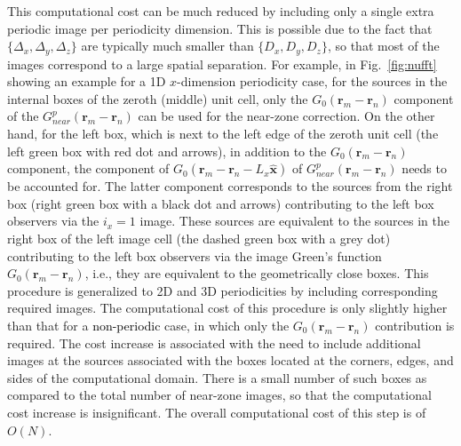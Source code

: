 \documentclass{article}
\begin{document}
This computational cost can be much reduced by including only a single extra periodic image per periodicity dimension. This is possible due to the fact that $\{\Delta_x,\Delta_y,\Delta_z\}$ are typically much smaller than $\{D_x,D_y,D_z\}$, so that most of the images correspond to a large spatial separation. For example, in Fig.~\ref{fig:nufft} showing an example for a 1D $x$-dimension periodicity case, for the sources in the internal boxes of the zeroth (middle) unit cell, only the $G_0(\mathbf{r}_m-\mathbf{r}_n)$ component of the $G^p_{near}(\mathbf{r}_m-\mathbf{r}_n)$ can be used for the near-zone correction. On the other hand, for the left box, which is next to the left edge of the zeroth unit cell (the left green box with red dot and arrows), in addition to the $G_0(\mathbf{r}_m-\mathbf{r}_n)$ component, the component of $G_0(\mathbf{r}_m-\mathbf{r}_n-L_x\mathbf{\hat{x}})$ of $G^p_{near}(\mathbf{r}_m-\mathbf{r}_n)$ needs to be accounted for. The latter component corresponds to the sources from the right box (right green box with a black dot and arrows) contributing to the left box observers via the $i_x=1$ image. These sources are equivalent to the sources in the right box of the left image cell (the dashed green box with a grey dot) contributing to the left box observers via the image Green's function $G_0(\mathbf{r}_m-\mathbf{r}_n)$, i.e., they are equivalent to the geometrically close boxes. This procedure is generalized to 2D and 3D periodicities by including corresponding required images. The computational cost of this procedure is only slightly higher than that for a \textcolor{black}{\textcolor{black}{non-periodic}} case, in which only the $G_0(\mathbf{r}_m-\mathbf{r}_n)$ contribution is required. The cost increase is associated with the need to include additional images at the sources associated with the boxes located at the corners, edges, and sides of the computational domain. There is a small number of such boxes as compared to the total number of near-zone images, so that the computational cost increase is insignificant. The overall computational cost of this step is of $O(N)$.
\end{document}
